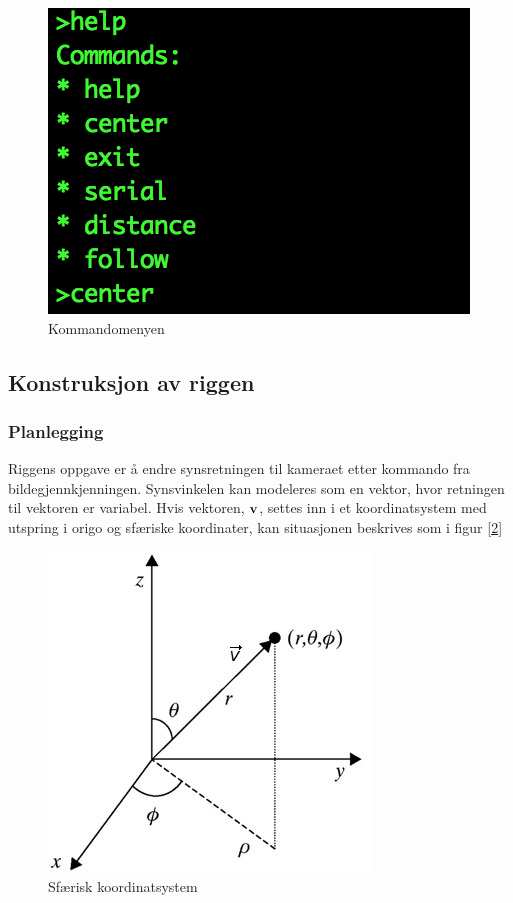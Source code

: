 \begin{figure}[h!]
	\centering
	\includegraphics[scale=0.8]{img/command-menu.png}
	\caption{Kommandomenyen}
	\label{fig:commandmenu}
\end{figure}

\subsection{Konstruksjon av riggen}

\subsubsection{Planlegging}
Riggens oppgave er å endre synsretningen til kameraet etter kommando fra bildegjennkjenningen. Synsvinkelen kan modeleres som en vektor, hvor retningen til vektoren er variabel. Hvis vektoren, $\bf{v}$, settes inn i et koordinatsystem med utspring i origo og sfæriske koordinater, kan situasjonen beskrives som i figur [\ref{fig:spher}]

\begin{figure}[h!]
	\centering
	\includegraphics[scale=0.5]{img/RettVek.jpg}
	\caption{Sfærisk koordinatsystem}
	\label{fig:spher}
\end{figure}

